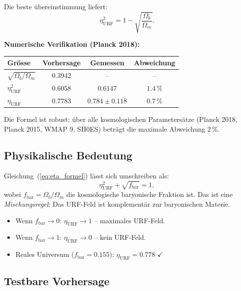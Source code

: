 \documentclass[12pt,a4paper]{article}
\theoremstyle{definition}
\begin{document}
Die beste übereinstimmung liefert:
\begin{equation}
\boxed{\eta_{\mathrm{URF}}^2 = 1 - \sqrt{\frac{\Omega_b}{\Omega_m}}.}
\label{eq:eta_formel}
\end{equation}

\textbf{Numerische Verifikation (Planck 2018):}
\begin{center}
\begin{tabular}{lccc}
\toprule
Grösse & Vorhersage & Gemessen & Abweichung \\
\midrule
$\sqrt{\Omega_b/\Omega_m}$ & $0.3942$ & -- & -- \\
$\eta_{\mathrm{URF}}^2$ & $0.6058$ & $0.6147$ & $1.4\,\%$ \\
$\eta_{\mathrm{URF}}$ & $0.7783$ & $0.784 \pm 0.118$ & $0.7\,\%$ \\
\bottomrule
\end{tabular}
\end{center}

Die Formel ist robust: über alle kosmologischen Parametersätze
(Planck 2018, Planck 2015, WMAP 9, SH0ES) beträgt die maximale
Abweichung $2\,\%$.

\subsection{Physikalische Bedeutung}

Gleichung~(\ref{eq:eta_formel}) lässt sich umschreiben als:
\begin{equation}
\eta_{\mathrm{URF}}^2 + \sqrt{f_{\mathrm{bar}}} = 1,
\end{equation}
wobei $f_{\mathrm{bar}} = \Omega_b/\Omega_m$ die kosmologische baryonische
Fraktion ist. Das ist eine \textit{Mischungsregel}: Das URF-Feld ist
komplementär zur baryonischen Materie.
\begin{itemize}
\item Wenn $f_{\mathrm{bar}} \to 0$: $\eta_{\mathrm{URF}} \to 1$ -- maximales URF-Feld.
\item Wenn $f_{\mathrm{bar}} \to 1$: $\eta_{\mathrm{URF}} \to 0$ -- kein URF-Feld.
\item Reales Universum ($f_{\mathrm{bar}} = 0.155$): $\eta_{\mathrm{URF}} = 0.778$ $\checkmark$
\end{itemize}

\subsection{Testbare Vorhersage}
\end{document}
